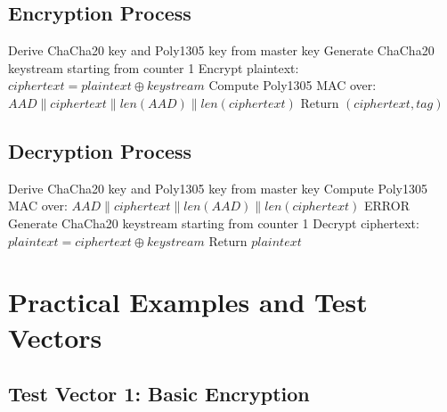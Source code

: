 \documentclass[11pt,a4paper]{article}
\begin{document}
\subsection{Encryption Process}

\begin{algorithm}[H]
\caption{ChaCha20-Poly1305 Encryption}
\begin{algorithmic}[1]
\State Derive ChaCha20 key and Poly1305 key from master key
\State Generate ChaCha20 keystream starting from counter 1
\State Encrypt plaintext: $ciphertext = plaintext \oplus keystream$
\State Compute Poly1305 MAC over: $AAD \| ciphertext \| len(AAD) \| len(ciphertext)$
\State Return $(ciphertext, tag)$
\end{algorithmic}
\end{algorithm}

\subsection{Decryption Process}

\begin{algorithm}[H]
\caption{ChaCha20-Poly1305 Decryption}
\begin{algorithmic}[1]
\State Derive ChaCha20 key and Poly1305 key from master key
\State Compute Poly1305 MAC over: $AAD \| ciphertext \| len(AAD) \| len(ciphertext)$
    \Return ERROR
\EndIf
\State Generate ChaCha20 keystream starting from counter 1
\State Decrypt ciphertext: $plaintext = ciphertext \oplus keystream$
\State Return $plaintext$
\end{algorithmic}
\end{algorithm}

\section{Practical Examples and Test Vectors}

\subsection{Test Vector 1: Basic Encryption}
\end{document}
